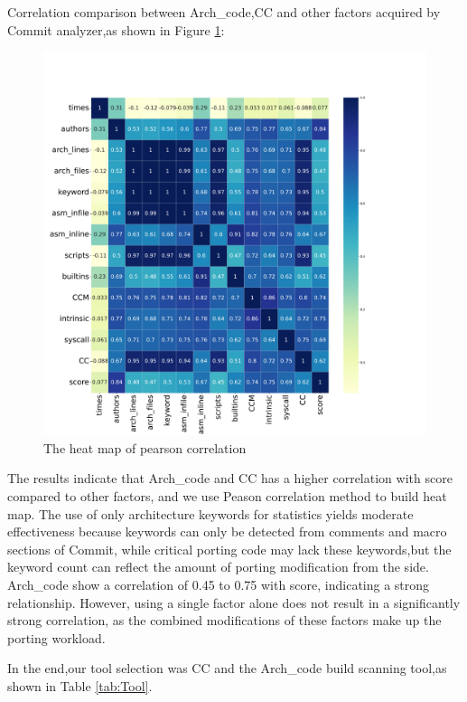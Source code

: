 \documentclass[sigconf,screen,review,anonymous]{acmart}
\begin{document}
Correlation comparison between Arch\_code,CC and other factors acquired by Commit analyzer,as shown in Figure \ref{fig:figure3}:
\begin{figure}
  \centering
  \includegraphics[width=\linewidth]{figure3.pdf}
  \caption{The heat map of pearson correlation}
  \label{fig:figure3}
\end{figure}
The results indicate that Arch\_code and CC has a higher correlation with score compared to other factors, and we use Peason correlation method to build heat map.
The use of only architecture keywords for statistics yields moderate effectiveness because keywords can only be detected from comments and macro sections of Commit, while critical porting code may lack these keywords,but the keyword count can reflect the amount of porting modification from the side.
Arch\_code show a correlation of 0.45 to 0.75 with score, indicating a strong relationship.
However, using a single factor alone does not result in a significantly strong correlation, as the combined modifications of these factors make up the porting workload.

In the end,our tool selection was CC and the Arch\_code build scanning tool,as shown in Table \ref{tab:Tool}.

\end{document}
